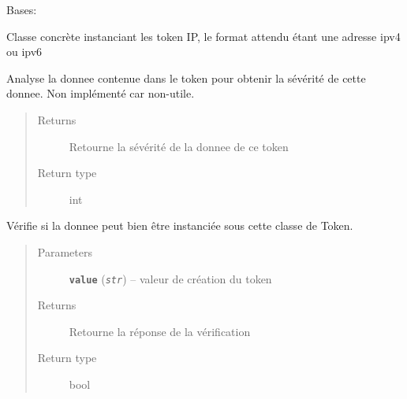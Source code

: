 \documentclass[letterpaper,10pt,english]{sphinxmanual}
\begin{document}
\begin{fulllineitems}
\label{loganalyser:loganalyser.token.IP}
Bases: {\hyperref[loganalyser:loganalyser.token.Token]{\emph{}}}

Classe concrète instanciant les token IP, le format attendu étant une adresse ipv4 ou ipv6

\begin{fulllineitems}
\label{loganalyser:loganalyser.token.IP._Token__analyse}
Analyse la donnee contenue dans le token pour obtenir la sévérité de cette donnee. Non implémenté car non-utile.
\begin{quote}\begin{description}
\item[{Returns}] \leavevmode
Retourne la sévérité de la donnee de ce token

\item[{Return type}] \leavevmode
int

\end{description}\end{quote}

\end{fulllineitems}


\begin{fulllineitems}
\label{loganalyser:loganalyser.token.IP._Token__verifier_type}
Vérifie si la donnee peut bien être instanciée sous cette classe de Token.
\begin{quote}\begin{description}
\item[{Parameters}] \leavevmode
\textbf{\texttt{value}} (\emph{\texttt{str}}) -- valeur de création du token

\item[{Returns}] \leavevmode
Retourne la réponse de la vérification

\item[{Return type}] \leavevmode
bool

\end{description}\end{quote}

\end{fulllineitems}


\end{fulllineitems}
\end{document}
